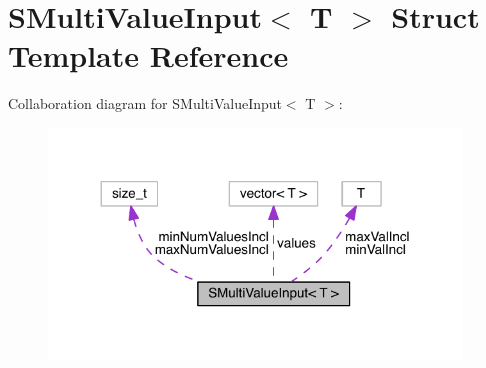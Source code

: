 \hypertarget{struct_s_multi_value_input}{}\section{S\+Multi\+Value\+Input$<$ T $>$ Struct Template Reference}
\label{struct_s_multi_value_input}


Collaboration diagram for S\+Multi\+Value\+Input$<$ T $>$\+:
\nopagebreak
\begin{figure}[H]
\begin{center}
\leavevmode
\includegraphics[width=311pt]{db/d0f/struct_s_multi_value_input__coll__graph}
\end{center}
\end{figure}
